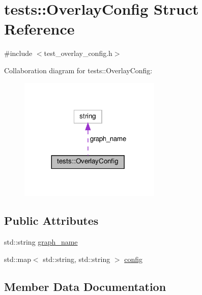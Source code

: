 \hypertarget{structtests_1_1OverlayConfig}{}\section{tests\+:\+:Overlay\+Config Struct Reference}
\label{structtests_1_1OverlayConfig}


{\ttfamily \#include $<$test\+\_\+overlay\+\_\+config.\+h$>$}



Collaboration diagram for tests\+:\+:Overlay\+Config\+:\nopagebreak
\begin{figure}[H]
\begin{center}
\leavevmode
\includegraphics[width=191pt]{structtests_1_1OverlayConfig__coll__graph}
\end{center}
\end{figure}
\subsection*{Public Attributes}
\begin{DoxyCompactItemize}
\item 
std\+::string \hyperlink{structtests_1_1OverlayConfig_a689d5f8a0c184b90d2efc491014c8d1e}{graph\+\_\+name}
\item 
std\+::map$<$ std\+::string, std\+::string $>$ \hyperlink{structtests_1_1OverlayConfig_a52f95fa0ae5619699aaca1ff497a1a0a}{config}
\end{DoxyCompactItemize}


\subsection{Member Data Documentation}
\mbox{\label{structtests_1_1OverlayConfig_a52f95fa0ae5619699aaca1ff497a1a0a}} 
